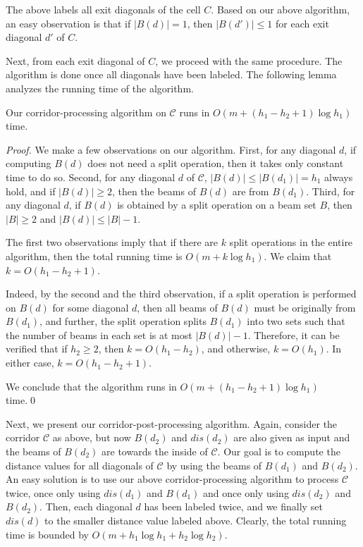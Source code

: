 \documentclass[english,runningheads,11pt]{llncs-revised}
\def\calC{\mathcal{C}}
\begin{document}
The above labels all exit diagonals of the cell $C$. Based on our above algorithm, an easy observation is that if $|B(d)|=1$, then $|B(d')|\leq 1$ for each exit diagonal $d'$ of $C$.

Next, from each exit diagonal of $C$,
we proceed with the same procedure. The algorithm is done once
all diagonals have been labeled. The following lemma analyzes the running time of the algorithm.

\begin{lemma}
Our corridor-processing algorithm on $\calC$ runs in $O(m+(h_1-h_2+1)\log h_1)$ time.
\end{lemma}
\begin{proof}
We make a few
observations on our algorithm. First,
for any diagonal $d$, if computing $B(d)$ does not need a split
operation, then it takes only constant time to do so.
Second, for any diagonal $d$ of $\calC$, $|B(d)|\leq |B(d_1)|=h_1$
always hold, and if $|B(d)|\geq 2$, then the beams of $B(d)$ are from
$B(d_1)$. Third, for any diagonal $d$, if $B(d)$ is obtained by a split
operation on a beam set $B$, then $|B|\geq 2$ and $|B(d)|\leq |B|-1$.

The first two observations imply that if there are $k$ split
operations in the entire algorithm, then the total running
time is $O(m+k\log h_1)$. We claim that $k=O(h_1-h_2+1)$.

Indeed, by the second and the third observation, if a split operation is performed on $B(d)$ for some diagonal $d$, then all beams of $B(d)$ must be originally from $B(d_1)$, and further, the split operation splits $B(d_1)$ into two sets such that the number of beams in each set is at most $|B(d)|-1$. Therefore, it can be verified that if $h_2\geq 2$, then $k=O(h_1-h_2)$, and otherwise, $k=O(h_1)$. In either case, $k=O(h_1-h_2+1)$.

We conclude that the algorithm runs in $O(m+(h_1-h_2+1)\log h_1)$ time.\qed
\end{proof}

Next, we present our corridor-post-processing algorithm. Again,
consider the corridor $\calC$ as above, but now $B(d_2)$ and
$dis(d_2)$ are also given as input and the beams of $B(d_2)$ are towards
the inside of $\calC$.
Our goal is to compute the distance values for
all diagonals of $\calC$ by using the beams of $B(d_1)$ and $B(d_2)$.
An easy solution is to use our above corridor-processing algorithm to process
$\calC$ twice, once only using $dis(d_1)$ and $B(d_1)$ and once only using
$dis(d_2)$ and $B(d_2)$. Then, each diagonal $d$ has
been labeled twice, and we finally set $dis(d)$ to the smaller distance value
labeled above. Clearly, the total running time is bounded by
$O(m+h_1\log h_1+h_2\log h_2)$.
\end{document}
